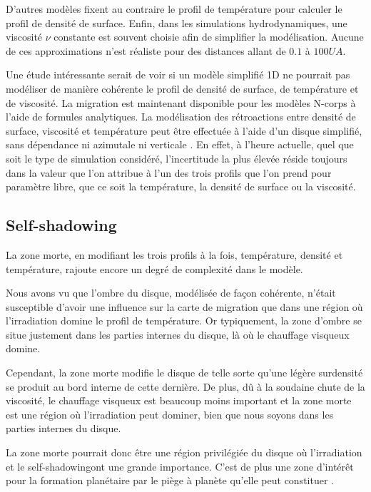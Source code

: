 D'autres modèles fixent au contraire le profil de température pour calculer le profil de densité de surface. Enfin, dans les simulations hydrodynamiques, une viscosité $\nu$ constante est souvent choisie afin de simplifier la modélisation. Aucune de ces approximations n'est réaliste pour des distances allant de $0.1$ à $100\unit{UA}$. 

Une étude intéressante serait de voir si un modèle simplifié 1D ne pourrait pas modéliser de manière cohérente le profil de densité de surface, de température et de viscosité. La migration est maintenant disponible pour les modèles N-corps à l'aide de formules analytiques. La modélisation des rétroactions entre densité de surface, viscosité et température peut être effectuée à l'aide d'un disque simplifié, sans dépendance ni azimutale ni verticale \citep{hellary2012global}. En effet, à l'heure actuelle, quel que soit le type de simulation considéré, l'incertitude la plus élevée réside toujours dans la valeur que l'on attribue à l'un des trois profils que l'on prend pour paramètre libre, que ce soit la température, la densité de surface ou la viscosité.

\subsection{Self-shadowing}
La zone morte, en modifiant les trois profils à la fois, température, densité et température, rajoute encore un degré de complexité dans le modèle.

Nous avons vu  que l'ombre du disque, modélisée de façon cohérente, n'était susceptible d'avoir une influence sur la carte de migration que dans une région où l'irradiation domine le profil de température. Or typiquement, la zone d'ombre se situe justement dans les parties internes du disque, là où le chauffage visqueux domine. 

Cependant, la zone morte modifie le disque de telle sorte qu'une légère surdensité se produit au bord interne de cette dernière. De plus, dû à la soudaine chute de la viscosité, le chauffage visqueux est beaucoup moins important et la zone morte est une région où l'irradiation peut dominer, bien que nous soyons dans les parties internes du disque. 

La zone morte pourrait donc être une région privilégiée du disque où l'irradiation et le \og self-shadowing\fg ont une grande importance. C'est de plus une zone d'intérêt pour la formation planétaire par le piège à planète qu'elle peut constituer \citep{masset2006disk, hasegawa2011origin}.

